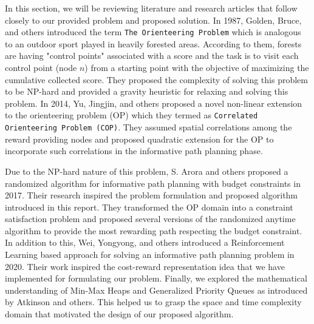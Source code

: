 In this section, we will be reviewing literature and research articles that follow closely to our provided problem and proposed solution. In 1987, Golden, Bruce, and others introduced the term \texttt{The Orienteering Problem} which is analogous to an outdoor sport played in heavily forested areas. According to them, forests are having "control points" associated with a score and the task is to visit each control point (node $n$) from a starting point with the objective of maximizing the cumulative collected score\cite{IPP2}. They proposed the complexity of solving this problem to be NP-hard and provided a gravity heuristic for relaxing and solving this problem\cite{IPP2}. In 2014, Yu, Jingjin, and others proposed a novel non-linear extension to the orienteering problem (OP) which they termed as \texttt{Correlated Orienteering Problem (COP)}\cite{IPP3}. They assumed spatial correlations among the reward providing nodes and proposed quadratic extension for the OP to incorporate such correlations in the informative path planning phase\cite{IPP3}.

Due to the NP-hard nature of this problem, S. Arora and others proposed a randomized algorithm for informative path planning with budget constraints in 2017\cite{IPPArora}. Their research inspired the problem formulation and proposed algorithm introduced in this report. They transformed the OP domain into a constraint satisfaction problem and proposed several versions of the randomized anytime algorithm to provide the most rewarding path respecting the budget constraint\cite{IPPArora}. In addition to this, Wei, Yongyong, and others introduced a Reinforcement Learning based approach for solving an informative path planning problem in 2020\cite{IPP4}. Their work inspired the cost-reward representation idea that we have implemented for formulating our problem. Finally, we explored the mathematical understanding of Min-Max Heaps and Generalized Priority Queues as introduced by Atkinson and others\cite{heap1}. This helped us to grasp the space and time complexity domain that motivated the design of our proposed algorithm.
